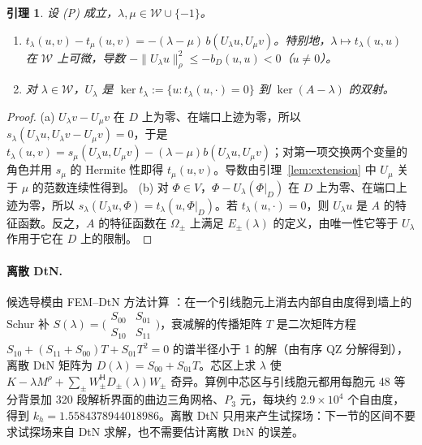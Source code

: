 \documentclass[11pt,a4paper,fontset=fandol]{ctexart}
\theoremstyle{plain}
\newtheorem{lemma}[theorem]{引理}
\theoremstyle{definition}
\theoremstyle{remark}
\begin{document}
\begin{lemma}
\label{lem:reduced}
设 (P) 成立，$\lambda,\mu\in\mathcal W\cup\{-1\}$。
\begin{enumerate}[label=(\alph*)]
\item $t_\lambda(u,v)-t_\mu(u,v)=-(\lambda-\mu)\,b(U_\lambda u,U_\mu v)$。特别地，$\lambda\mapsto t_\lambda(u,u)$ 在 $\mathcal W$ 上可微，导数 $-\|U_\lambda u\|_\rho^2\le-b_D(u,u)<0$（$u\ne0$）。
\item 对 $\lambda\in\mathcal W$，$U_\lambda$ 是 $\ker t_\lambda:=\{u:t_\lambda(u,\cdot)=0\}$ 到 $\ker(A-\lambda)$ 的双射。
\end{enumerate}
\end{lemma}

\begin{proof}
(a) $U_\lambda v-U_\mu v$ 在 $D$ 上为零、在端口上迹为零，所以 $s_\lambda(U_\lambda u,U_\lambda v-U_\mu v)=0$，于是 $t_\lambda(u,v)=s_\mu(U_\lambda u,U_\mu v)-(\lambda-\mu)b(U_\lambda u,U_\mu v)$；对第一项交换两个变量的角色并用 $s_\mu$ 的 Hermite 性即得 $t_\mu(u,v)$。导数由引理~\ref{lem:extension} 中 $U_\mu$ 关于 $\mu$ 的范数连续性得到。
(b) 对 $\Phi\in V$，$\Phi-U_\lambda(\Phi|_D)$ 在 $D$ 上为零、在端口上迹为零，所以 $s_\lambda(U_\lambda u,\Phi)=t_\lambda(u,\Phi|_D)$。若 $t_\lambda(u,\cdot)=0$，则 $U_\lambda u$ 是 $A$ 的特征函数。反之，$A$ 的特征函数在 $\Omega_\pm$ 上满足 $E_\pm(\lambda)$ 的定义，由唯一性它等于 $U_\lambda$ 作用于它在 $D$ 上的限制。
\end{proof}

\paragraph{离散 DtN.} 候选导模由 FEM--DtN 方法计算 \cite{JolyLiFliss2006,KlindworthSchmidtFliss2014}：在一个引线胞元上消去内部自由度得到墙上的 Schur 补 $S(\lambda)=\bigl(\begin{smallmatrix}S_{00}&S_{01}\\S_{10}&S_{11}\end{smallmatrix}\bigr)$，衰减解的传播矩阵 $T$ 是二次矩阵方程 $S_{10}+(S_{11}+S_{00})T+S_{01}T^2=0$ 的谱半径小于 1 的解（由有序 QZ 分解得到），离散 DtN 矩阵为 $D(\lambda)=S_{00}+S_{01}T$。芯区上求 $\lambda$ 使 $K-\lambda M^\rho+\sum_\pm W_\pm^{\mathsf H}D_\pm(\lambda)W_\pm$ 奇异。算例中芯区与引线胞元都用每胞元 48 等分背景加 320 段解析界面的曲边三角网格、$P_3$ 元，每块约 $2.9\times10^4$ 个自由度，得到 $k_h=1.5584378944018986$。离散 DtN 只用来产生试探场：下一节的区间不要求试探场来自 DtN 求解，也不需要估计离散 DtN 的误差。
\end{document}
